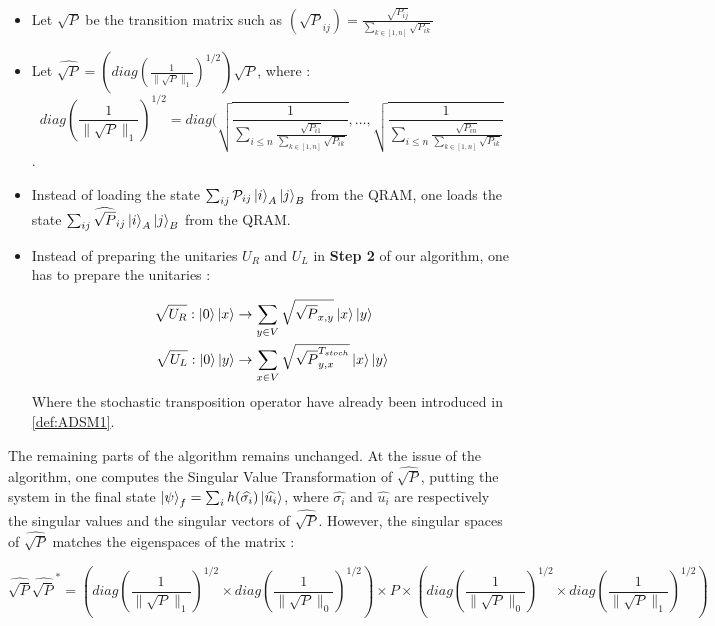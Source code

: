 \documentclass[sn-mathphys]{sn-jnl}%
\theoremstyle{thmstyleone}%
\theoremstyle{thmstyletwo}%
\theoremstyle{thmstylethree}%
\begin{document}
\begin{itemize}
\item Let $\sqrt{P}$ be the transition matrix such as
  $(\sqrt{P}_{ij}) = \frac{\sqrt{P_{ij}}}{\sum_{k \in [1,n]}
    \sqrt{P_{ik}}}$
    
\item Let
  $\widehat{\sqrt{P}} = (diag(\frac{1}{\|\sqrt{P}\|_1})^{1/2})
  \sqrt{P}$, where :
  \begin{equation}
    diag(\frac{1}{\|\sqrt{P}\|_1})^{1/2} = diag(\sqrt{\frac{1}{\sum_{i\leq n}\frac{\sqrt{P_{i1}}}{\sum_{k \in [1,n]} \sqrt{P_{ik}}}}}, \hdots, \sqrt{\frac{1}{\sum_{i\leq n}\frac{\sqrt{P_{in}}}{\sum_{k \in [1,n]} \sqrt{P_{ik}}}}}
  \end{equation}.
  
\item Instead of loading the state
  $\sum_{ij} \mathcal{P}_{ij} \ket{i}_A \ket{j}_B$ from the QRAM, one
  loads the state
  $\sum_{ij} \widehat{\sqrt{P}}_{ij} \ket{i}_A \ket{j}_B$ from the
  QRAM.
    
\item Instead of preparing the unitaries $U_R$ and $U_L$ in
  \textbf{Step 2} of our algorithm, one has to prepare the unitaries :
    
  \begin{align}
    \sqrt{U_R} : \ket{0}\ket{x} &\rightarrow \sum_{y\in V} \sqrt{\sqrt{P}_{x,y}} \ket{x} \ket{y} \\
    \sqrt{U_L} : \ket{0}\ket{y} &\rightarrow \sum_{x\in V} \sqrt{\sqrt{P}^{T_{stoch}}_{y,x}} \ket{x} \ket{y}
  \end{align}
  Where the stochastic transposition operator have already been
  introduced in \ref{def:ADSM1}.
\end{itemize}

The remaining parts of the algorithm remains unchanged. At the issue
of the algorithm, one computes the Singular Value Transformation of
$\widehat{\sqrt{P}}$, putting the system in the final state
$\ket{\psi}_f = \sum_i h(\widehat{\sigma_i}) \ket{\widehat{u_i}}$,
where $\widehat{\sigma_i}$ and $\widehat{u_i}$ are respectively the
singular values and the singular vectors of
$\widehat{\sqrt{P}}$. However, the singular spaces of
$\widehat{\sqrt{P}}$ matches the eigenspaces of the matrix :

\begin{equation}
  \widehat{\sqrt{P}}\widehat{\sqrt{P}}^* = (diag(\frac{1}{\|\sqrt{P}\|_1})^{1/2} \times diag(\frac{1}{\|\sqrt{P}\|_0})^{1/2}) \times P \times (diag(\frac{1}{\|\sqrt{P}\|_0})^{1/2} \times diag(\frac{1}{\|\sqrt{P}\|_1})^{1/2})
\end{equation}
\end{document}
